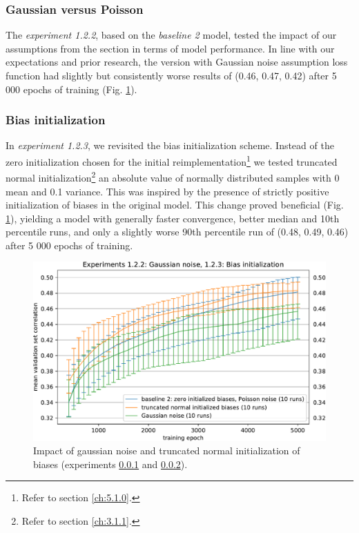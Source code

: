\subsubsection{Gaussian versus Poisson}\label{ex:1.2.2}
The \emph{experiment 1.2.2}, based on the \emph{baseline 2} model, tested the impact of our assumptions from the  section in terms of model performance. In line with our expectations and prior research, the version with Gaussian noise assumption loss function had slightly but consistently worse results of (0.46, 0.47, 0.42) after 5 000 epochs of training (Fig. \ref{fig:5.1.2.2}). 

\subsubsection{Bias initialization}\label{ex:1.2.3}

In \emph{experiment 1.2.3}, we revisited the bias initialization scheme. Instead of the zero initialization chosen for the initial reimplementation\footnote{Refer to section \ref{ch:5.1.0}.} we tested truncated normal initialization\footnote{Refer to section \ref{ch:3.1.1}.} an absolute value of normally distributed samples with 0 mean and 0.1 variance. This was inspired by the presence of strictly positive initialization of biases in the original model. This change proved beneficial (Fig. \ref{fig:5.1.2.2}), yielding a model with generally faster convergence, better median and 10th percentile runs, and only a slightly worse 90th percentile run of (0.48, 0.49, 0.46) after 5 000 epochs of training.

\begin{figure}[H]
    \centering
    \includegraphics[width=1\textwidth]{../figures/05_1_2_2}
    \caption[Experiments 1.2.2 and 1.2.3]{Impact of gaussian noise and truncated normal initialization of biases (experiments \ref{ex:1.2.2} and \ref{ex:1.2.3}).}
    \label{fig:5.1.2.2}
\end{figure}

